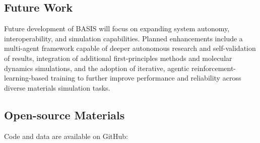 
\subsection*{Future Work}
Future development of BASIS will focus on expanding system autonomy, interoperability, and simulation capabilities. Planned enhancements include a multi-agent framework capable of deeper autonomous research and self-validation of results, integration of additional first-principles methods and molecular dynamics simulations, and the adoption of iterative, agentic reinforcement-learning-based training to further improve performance and reliability across diverse materials simulation tasks.

\subsection*{Open-source Materials}
Code and data are available on GitHub: 






